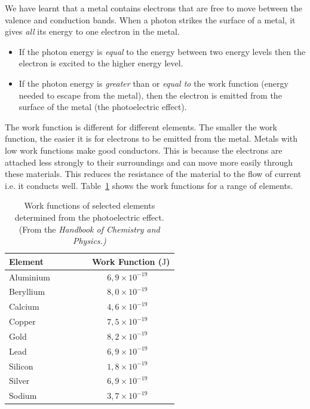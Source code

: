 
We have learnt that a metal contains electrons that are free to move between the valence and conduction bands. When a photon strikes the surface of a metal, it gives \textit{all} its energy to one electron in the metal. 
\begin{itemize}
\item If the photon energy is \textit{equal} to the energy between two energy levels then the electron is excited to the higher energy level.
\item If the photon energy is \textit{greater} than or \textit{equal to} the work function (energy needed to escape from the metal), then the electron is emitted from the surface of the metal (the photoelectric effect). 
\end{itemize}

The work function is different for different elements. The smaller the work function, the easier it is for electrons to be emitted from the metal. Metals with low work functions make good conductors. This is because the electrons are attached less strongly to their surroundings and can move more easily through these materials. This reduces the resistance of the material to the flow of current i.e. it conducts well. Table~\ref{tab:work_fun} shows the work functions for a range of elements.

\begin{table}[!h]
\begin{center}
\begin{tabular}{lc}
\hline
Element ~~~ & ~~~~ Work Function ($\mathrm{J}$) \\
\hline
Aluminium & ~~~ $6,9\times 10^{-19} $ \\
Beryllium & ~~~ $8,0 \times 10^{-19} $ \\
Calcium & ~~~ $4,6 \times 10^{-19} $ \\
Copper & ~~~ $7,5 \times 10^{-19}  $ \\
Gold & ~~~ $8,2 \times 10^{-19}  $ \\
Lead & ~~~ $6,9 \times 10^{-19}  $ \\
Silicon & ~~~ $1,8 \times 10^{-19}  $ \\
Silver & ~~~ $6,9 \times 10^{-19}  $ \\
Sodium & ~~~ $3,7 \times 10^{-19} $ \\
\hline
\end{tabular}
\caption{{ Work functions of selected elements determined from the photoelectric effect. (From the \it{Handbook of Chemistry and Physics.})}}
\label{tab:work_fun}
\end{center}
\end{table}


